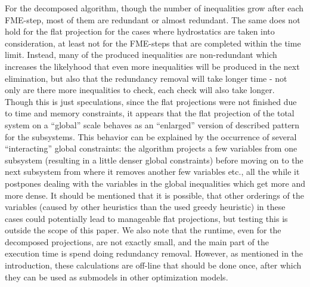 For the decomposed algorithm, though the number of inequalities grow after each FME-step, most of them are redundant or almost redundant. The same does not hold for the flat projection for the cases where hydrostatics are taken into consideration, at least not for the FME-steps that are completed within the time limit. Instead, many of the produced inequalities are non-redundant which increases the likelyhood that even more inequalities will be produced in the next elimination, but also that the redundancy removal will take longer time - not only are there more inequalities to check, each check will also take longer. Though this is just speculations, since the flat projections were not finished due to time and memory constraints, it appears that the flat projection of the total system on a ``global'' scale behaves as an ``enlarged'' version of described pattern for the subsystems.
This behavior can be explained by the occurrence of several ``interacting'' global constraints: the algorithm projects a few variables from one subsystem (resulting in a little denser global constraints) before moving on to the next subsystem from where it removes another few variables etc., all the while it postpones dealing with the variables in the global inequalities which get more and more dense. It should be mentioned that it is possible, that other orderings of the variables (caused by other heuristics than the used greedy heuristic) in these cases could potentially lead to manageable flat projections, but testing this is outside the scope of this paper.  
We also note that the runtime, even for the decomposed projections, are not exactly small, and the main part of the execution time is spend doing redundancy removal. However, as mentioned in the introduction, these calculations are off-line that should be done once, after which they can be used as submodels in other optimization models.  


